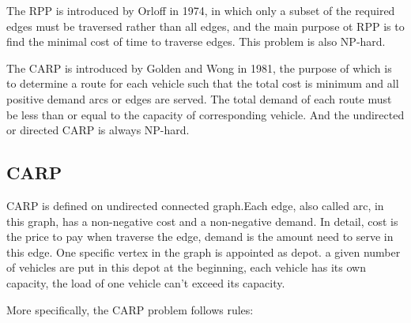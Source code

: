 \documentclass[journal]{IEEEtran}
\begin{document}
	The RPP is introduced by Orloff in 1974\cite{RPP}, in which only a subset of the required edges must be traversed rather than all edges, and the main purpose ot RPP is to find the minimal cost of time to traverse edges. This problem is also NP-hard.
	
	The CARP is introduced by Golden and Wong in 1981\cite{CARP}, the purpose of which is to determine a route for each vehicle such that the total cost is minimum and all positive demand arcs or edges are served. The total demand of each route must be less than or equal to the capacity of corresponding vehicle. And the undirected or directed CARP is always NP-hard.
	
	
	\subsection{CARP}
	CARP is defined on undirected connected graph.Each edge, also called arc, in this graph, has a non-negative cost and a non-negative demand. In detail, cost is the price to pay when traverse the edge, demand is the amount need to serve in this edge. One specific vertex in the graph is appointed as depot. a given number of vehicles are put in this depot at the beginning, each vehicle has its own capacity, the load of one vehicle can't exceed its capacity.
	
	More specifically, the CARP problem follows rules:
	
\end{document}

